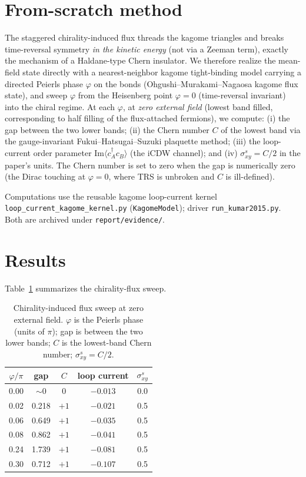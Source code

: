 \documentclass[aps,prb,twocolumn,superscriptaddress,nofootinbib]{revtex4-2}
\begin{document}
\section{From-scratch method}
The staggered chirality-induced flux threads the kagome triangles and breaks
time-reversal symmetry \emph{in the kinetic energy} (not via a Zeeman term),
exactly the mechanism of a Haldane-type Chern insulator. We therefore realize
the mean-field state directly with a nearest-neighbor kagome tight-binding
model carrying a directed Peierls phase $\varphi$ on the bonds
(Ohgushi--Murakami--Nagaosa kagome flux state), and sweep $\varphi$ from the
Heisenberg point $\varphi=0$ (time-reversal invariant) into the chiral regime.
At each $\varphi$, at \emph{zero external field} (lowest band filled,
corresponding to half filling of the flux-attached fermions), we compute:
(i) the gap between the two lower bands; (ii) the Chern number $C$ of the
lowest band via the gauge-invariant Fukui--Hatsugai--Suzuki plaquette method;
(iii) the loop-current order parameter $\mathrm{Im}\langle c_A^\dagger c_B\rangle$
(the iCDW channel); and (iv) $\sigma^s_{xy}=C/2$ in the paper's units. The
Chern number is set to zero when the gap is numerically zero (the Dirac
touching at $\varphi=0$, where TRS is unbroken and $C$ is ill-defined).

Computations use the reusable kagome loop-current kernel
\texttt{loop\_current\_kagome\_kernel.py} (\texttt{KagomeModel}); driver
\texttt{run\_kumar2015.py}. Both are archived under \texttt{report/evidence/}.

\section{Results}
Table~\ref{tab:sweep} summarizes the chirality-flux sweep.

\begin{table}[t]
\caption{Chirality-induced flux sweep at zero external field.
$\varphi$ is the Peierls phase (units of $\pi$); gap is between the two lower
bands; $C$ is the lowest-band Chern number; $\sigma^s_{xy}=C/2$.}
\label{tab:sweep}
\begin{ruledtabular}
\begin{tabular}{ccccc}
$\varphi/\pi$ & gap & $C$ & loop current & $\sigma^s_{xy}$ \\
\hline
0.00 & $\sim\!0$   & 0 & $-0.013$ & 0.0 \\
0.02 & 0.218 & $+1$ & $-0.021$ & 0.5 \\
0.06 & 0.649 & $+1$ & $-0.035$ & 0.5 \\
0.08 & 0.862 & $+1$ & $-0.041$ & 0.5 \\
0.24 & 1.739 & $+1$ & $-0.081$ & 0.5 \\
0.30 & 0.712 & $+1$ & $-0.107$ & 0.5 \\
\end{tabular}
\end{ruledtabular}
\end{table}
\end{document}
